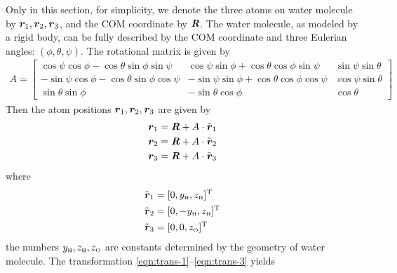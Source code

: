 \documentclass[aip,jcp,a4paper,reprint,onecolumn]{revtex4-1}
\newcommand{\vect}[1]{\textbf{\textit{#1}}}
\newcommand{\trans}{\textrm{T}}
\newcommand{\footh}{\textrm{\tiny H}}
\newcommand{\footo}{\textrm{\tiny O}}
\begin{document}
Only in this section, for simplicity, we denote the three atoms on
water molecule by $\vect r_1, \vect r_2, \vect r_3$, and the COM
coordinate by $\vect R$. The water molecule, as modeled by a rigid
body, can be fully described by the COM coordinate and three Eulerian
angles: $(\phi, \theta, \psi)$. The rotational matrix is given by
\begin{align}
  A =
  \left[
  \begin{array}{rrr}
    \cos\psi \cos\phi - \cos\theta \sin\phi \sin\psi &
    \cos\psi \sin\phi + \cos\theta \cos\phi \sin\psi &
    \sin\psi \sin\theta \\
    -\sin\psi \cos\phi - \cos\theta \sin\phi \cos\psi &
    -\sin\psi \sin\phi + \cos\theta \cos\phi \cos\psi &
    \cos\psi \sin\theta \\
     \sin\theta \sin\phi &
     -\sin\theta \cos\phi &
     \cos\theta
   \end{array}
   \right]
\end{align}
Then the atom positions  $\vect r_1, \vect r_2, \vect r_3$ are given by
\begin{align}\label{eqn:trans-1}
  \vect r_1 & = \vect R + A\cdot \tilde {\vect r}_1\\\label{eqn:trans-2}
  \vect r_2 & = \vect R + A\cdot \tilde {\vect r}_2\\\label{eqn:trans-3}
  \vect r_3 & = \vect R + A\cdot \tilde {\vect r}_3
\end{align}
where
\begin{align}
  \tilde{\vect r}_1 &= [0, y_\footh, z_\footh]^\trans\\
  \tilde{\vect r}_2 &= [0, -y_\footh, z_\footh]^\trans\\
  \tilde{\vect r}_3 &= [0, 0, z_\footo]^\trans
\end{align}
the numbers $y_\footh, z_\footh, z_\footo$ are constants determined by the geometry
of water molecule.  The transformation
\eqref{eqn:trans-1}--\eqref{eqn:trans-3} yields
\end{document}
